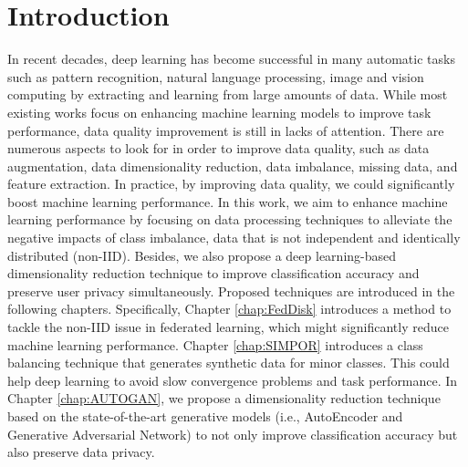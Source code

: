


\chapter{Introduction}
\label{chap:Intro}

In recent decades, deep learning has become successful in many automatic tasks such as pattern recognition, natural language processing, image and vision computing by extracting and learning from large amounts of data. While most existing works focus on enhancing machine learning models to improve task performance, data quality improvement is still in lacks of attention. There are numerous aspects to look for in order to improve data quality, such as data augmentation, data dimensionality reduction, data imbalance, missing data, and feature extraction. In practice, by improving data quality, we could significantly boost machine learning performance. In this work, we aim to enhance machine learning performance by focusing on data processing techniques to alleviate the negative impacts of class imbalance, data that is not independent and identically distributed (non-IID). Besides, we also propose a deep learning-based dimensionality reduction technique to improve classification accuracy and preserve user privacy simultaneously. Proposed techniques are introduced in the following chapters. Specifically, Chapter \ref{chap:FedDisk} introduces a method to tackle the non-IID issue in federated learning, which might significantly reduce machine learning performance. Chapter \ref{chap:SIMPOR} introduces a class balancing technique that generates synthetic data for minor classes. This could help deep learning to avoid slow convergence problems and task performance. In Chapter \ref{chap:AUTOGAN}, we propose a dimensionality reduction technique based on the state-of-the-art generative models (i.e., AutoEncoder and Generative Adversarial Network) to not only improve classification accuracy but also preserve data privacy. 
